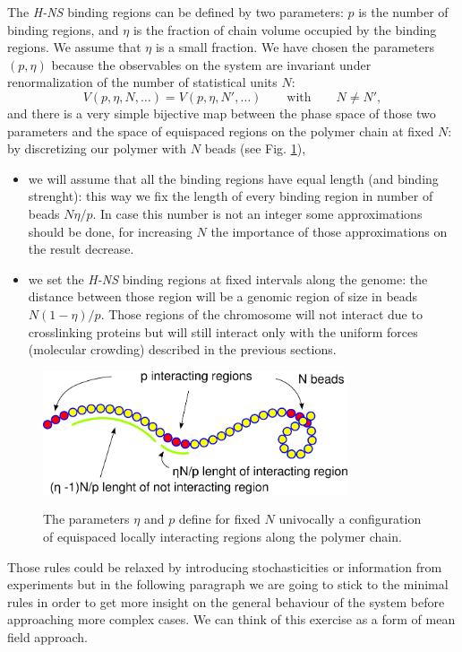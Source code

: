 \documentclass[12pt,a4paper,notitlepage]{article}
\newcommand{\hns}{\emph{H-NS}\xspace}
\begin{document}
The \hns binding regions can be defined by two parameters: $p$ is
the number of binding regions, and $\eta$ is the fraction of chain
volume occupied by the binding regions. We assume that $\eta$ is a
small fraction. We have chosen the parameters $(p, \eta)$ because the
observables on the system are invariant under renormalization of
the number of statistical units $N$:
\begin{equation}
  V(p, \eta, N, \dots) = V(p, \eta, N', \dots) \qquad \mathrm{with}
  \qquad N \neq N',
\end{equation}
and there is a very simple bijective map between the phase space of
those two parameters and the space of equispaced regions on the
polymer chain at fixed $N$: by discretizing our polymer
with $N$ beads (see Fig. \ref{fig:locuniexpl}),
\begin{itemize}
\item
we will assume that all the binding regions have equal length (and
binding strenght): this way we fix the length of every binding region
in number of beads $N \eta / p$. In case this number is not an
integer some approximations should be done, for increasing $N$
the importance of those approximations on the result decrease.
\item
we set the \hns binding regions at fixed intervals along the
genome: the distance between those region will be a genomic region of
size in beads $N(1 - \eta)/p$. Those regions of the chromosome will
not interact due to crosslinking proteins but will still interact only
with the uniform forces (molecular crowding) described in the previous
sections.
\end{itemize}
\begin{figure}[h!]
\centering
\includegraphics[width=9cm]{local_unif_config}\\
\caption{The parameters $\eta$ and $p$ define for fixed $N$ univocally
  a configuration of equispaced locally interacting regions along the
  polymer chain.}
\label{fig:locuniexpl}
\end{figure}
Those rules could be relaxed by introducing stochasticities or
information from experiments but in the following paragraph we are
going to stick to the minimal rules in order to get more insight on
the general behaviour of the system before approaching more complex
cases. We can think of this exercise as a form of mean field
approach.
\end{document}
